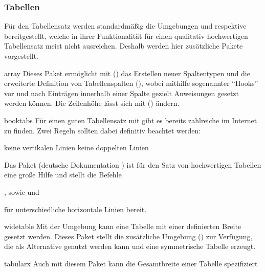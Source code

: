 %



\subsubsection{%
  Tabellen%
}
Für den Tabellensatz werden standardmäßig die Umgebungen  
und  respektive  bereitgestellt, 
welche in ihrer Funktionalität für einen qualitativ hochwertigen Tabellensatz 
meist nicht ausreichen. Deshalb werden hier zusätzliche Pakete vorgestellt. 
%
\begin{packages}
\item[array]
  Dieses Paket ermöglicht mit () das   
  Erstellen neuer Spaltentypen und die erweiterte Definition von Tabellenspalten
  (\PValue{>\MPValue{\dots}}\PValue{<\MPValue{\dots}}),   
  wobei mithilfe sogenannter \enquote{Hooks} vor und nach Einträgen innerhalb 
  einer Spalte gezielt Anweisungen gesetzt werden können. Die Zeilenhöhe lässt 
  sich mit () ändern. 
\item[booktabs]
  Für einen guten Tabellensatz mit  gibt es bereits zahlreiche 
   im 
  Internet zu finden. Zwei Regeln sollten dabei definitiv beachtet werden:
  \begin{enumerate}[itemindent=0pt,labelwidth=*,labelsep=1em,label=\Roman*.]
  \stditem keine vertikalen Linien
  \stditem keine doppelten Linien
  \end{enumerate}
  Das Paket  (deutsche Dokumentation ) 
  ist für den Satz von hochwertigen Tabellen eine große Hilfe und stellt die 
  Befehle 
  \begin{Entity}{}
  ,  sowie  und 
  \end{Entity}
  für unterschiedliche horizontale Linien bereit.
\item[widetable]
  Mit der Umgebung  kann eine Tabelle mit einer definierten 
  Breite gesetzt werden. Dieses Paket stellt die zusätzliche Umgebung 
  () zur Verfügung, die als Alternative 
  genutzt werden kann und eine symmetrische Tabelle erzeugt.
\item[tabularx]
  Auch mit diesem Paket kann die Gesamtbreite einer Tabelle spezifiziert 

\end{packages}
